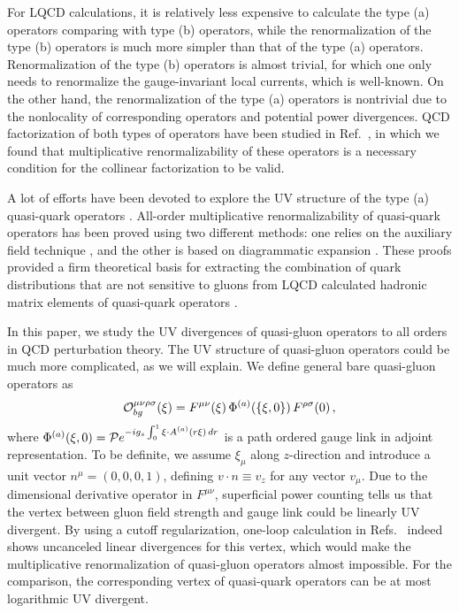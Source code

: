 For LQCD calculations, it is relatively less expensive to calculate the type (a) operators comparing with type (b) operators, while the renormalization of the type (b) operators is much more simpler than that of the type (a) operators.
Renormalization of the type (b) operators is almost trivial, for which one only needs to renormalize the gauge-invariant local currents, which is well-known.  On the other hand, the renormalization of the type (a) operators is nontrivial due to the nonlocality of corresponding operators and potential power divergences.  QCD factorization of both types of operators have been studied in Ref.~\cite{Ma:2017pxb}, in which we found that multiplicative renormalizability of these operators is a necessary condition for the collinear factorization to be valid.

A lot of efforts have been devoted to explore the UV structure of the type (a) quasi-quark operators \cite{Ishikawa:2016znu,Chen:2016fxx,Monahan:2016bvm,Briceno:2017cpo, Xiong:2017jtn, Constantinou:2017sej, Alexandrou:2017huk, Chen:2017mzz}.
All-order multiplicative renormalizability of quasi-quark operators has been proved using two different methods: one relies on the auxiliary field technique \cite{Ji:2017oey,Green:2017xeu}, and the other is based on diagrammatic expansion \cite{Ishikawa:2017faj}. These proofs provided a firm theoretical basis for extracting the combination of quark distributions that are not sensitive to gluons from LQCD calculated  hadronic matrix elements of quasi-quark operators \cite{Lin:2014zya,Alexandrou:2015rja,Chen:2016utp,Alexandrou:2016jqi,Zhang:2017bzy,Monahan:2017hpu,Chen:2017lnm,Stewart:2017tvs,Izubuchi:2018srq,Alexandrou:2018pbm,Chen:2018xof,Chen:2018fwa,Liu:2018uuj,Bali:2018spj,Radyushkin:2018nbf,Lin:2018qky,Karpie:2018zaz}.

In this paper, we study the UV divergences of quasi-gluon operators to all orders in QCD perturbation theory. The UV structure of quasi-gluon operators could be much more complicated, as we will explain. We define general bare quasi-gluon operators as
\begin{align}\label{eq:ftgx}
\begin{split}
{\cal O}_{bg}^{\mu \nu \rho\sigma}(\xi) = F^{\mu \nu}(\xi)\,\Phi^{(a)}(\{\xi,0\})\, F^{{\rho\sigma}}(0)\,,
\end{split}
\end{align}
where $\Phi^{(a)}(\xi,0)={\cal P}e^{-ig_s\int_0^{1} \xi\cdot A^{(a)}(r \xi)\,dr}$ is a path ordered gauge link in adjoint representation. To be definite, we assume $\xi_\mu$ along $z$-direction and introduce a unit vector $n^\mu = (0,0,0, 1)$, defining $v\cdot n \equiv v_z$ for any vector $v_\mu$.  Due to the dimensional derivative operator in $F^{\mu\nu}$, superficial power counting tells us that the vertex between gluon field strength and gauge link could be linearly UV divergent. By using a cutoff regularization, one-loop calculation in Refs.~\cite{Wang:2017qyg,Wang:2017eel} indeed shows uncanceled linear divergences for this vertex, which would make the multiplicative renormalization of quasi-gluon operators almost impossible.  For the comparison, the corresponding vertex of quasi-quark operators can be at most logarithmic UV divergent.

